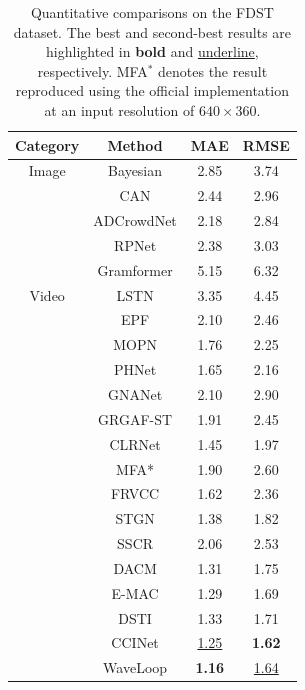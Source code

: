 \documentclass[lettersize,journal]{IEEEtran}
\begin{document}
\begin{table}[h]
\caption{Quantitative comparisons on the FDST dataset. The best and second-best results are highlighted in \textbf{bold} and \underline{underline}, respectively. MFA$^{*}$ denotes the result reproduced using the official implementation at an input resolution of $640\times360$.}
\centering
\scriptsize
\begin{tabular}{@{}cccc@{}}
\toprule
Category & Method & MAE & RMSE  \\ 
\midrule
Image & Bayesian \cite{ma2019bayesian} & 2.85 & 3.74 \\
& CAN \cite{liu2019context} & 2.44 & 2.96 \\
& ADCrowdNet \cite{liu2019adcrowdnet} & 2.18 & 2.84 \\
& RPNet \cite{yang2020reverse} & 2.38 & 3.03 \\
& Gramformer \cite{lin2024gramformer} & 5.15 & 6.32 \\
\midrule
Video & LSTN \cite{fang2019locality} & 3.35 & 4.45 \\
& EPF \cite{liu2020estimating} & 2.10 & 2.46 \\
& MOPN \cite{hossain2020video}  & 1.76 & 2.25 \\
& PHNet \cite{meng2021phnet} & 1.65 & 2.16 \\
& GNANet \cite{li2022video} & 2.10 & 2.90 \\
& GRGAF-ST \cite{cai2022global} & 1.91 & 2.45 \\
& CLRNet \cite{dong2022clrnet} & 1.45 & 1.97 \\
& MFA* \cite{ling2023motional} & 1.90 & 2.60 \\
& FRVCC \cite{hou2023frame} & 1.62 & 2.36 \\
& STGN \cite{wu2022spatial} & {1.38} & {1.82} \\
& SSCR \cite{yong2025lightweight} & 2.06 & 2.53 \\
& DACM \cite{ling2025dual} & 1.31 & 1.75 \\
& E-MAC \cite{cao2024efficient} & 1.29 & 1.69 \\
& DSTI \cite{ling2026dual} & 1.33 & 1.71 \\
& CCINet \cite{ling2026cascaded} & \underline{1.25} & \textbf{1.62} \\
& WaveLoop  & \textbf{1.16} & \underline{1.64} \\
\bottomrule
\end{tabular}
\label{tab:2}
 \vspace{-1em}
\end{table}
\end{document}
